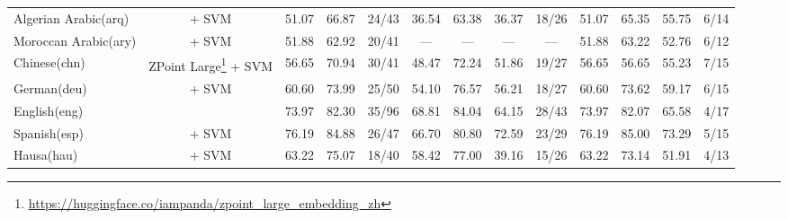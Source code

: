 \begin{table*}[h]
{\begin{tabular}{l|c|ccc|cccc|cccc}
            Algerian Arabic(arq)                    & \citep{wang2024multilingual}   + SVM                                                         & 51.07                        & 66.87                        & 24/43                       & 36.54         & 63.38         & 36.37             & 18/26         & 51.07         & 65.35         & 55.75             & 6/14          \\
            Moroccan Arabic(ary)                    & \citep{wang2024multilingual}   + SVM                                                         & 51.88                        & 62.92                        & 20/41                       & —             & —             & —                 & —             & 51.88         & 63.22         & 52.76             & 6/12          \\
            Chinese(chn)                            & ZPoint Large\footnote{\url{https://huggingface.co/iampanda/zpoint_large_embedding_zh}} + SVM & 56.65                        & 70.94                        & 30/41                       & 48.47         & 72.24         & 51.86             & 19/27         & 56.65         & 56.65         & 55.23             & 7/15          \\
            German(deu)                             & \citep{wang2024multilingual}       + SVM                                                     & 60.60                        & 73.99                        & 25/50                       & 54.10         & 76.57         & 56.21             & 18/27         & 60.60         & 73.62         & 59.17             & 6/15          \\
            English(eng)                            & \citep{zhang2025jasperstelladistillationsota}                                                & 73.97                        & 82.30                        & 35/96                       & 68.81         & 84.04         & 64.15             & 28/43         & 73.97         & 82.07         & 65.58             & 4/17          \\
            Spanish(esp)                            & \citep{wang2024multilingual}      + SVM                                                      & 76.19                        & 84.88                        & 26/47                       & 66.70         & 80.80         & 72.59             & 23/29         & 76.19         & 85.00         & 73.29             & 5/15          \\
            Hausa(hau)                              & \citep{dobler-demelo-2023-focus} + SVM                                                       & 63.22                        & 75.07                        & 18/40                       & 58.42         & 77.00         & 39.16             & 15/26         & 63.22         & 73.14         & 51.91             & 4/13          \\

\end{tabular}}
\end{table*}
